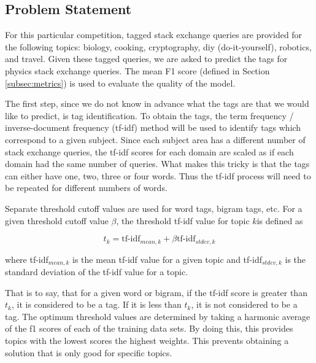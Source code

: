 \documentclass{article}
\def\eqstart{\begin{equation}}
\def\eqend{\end{equation}}
\begin{document}
\subsection{Problem Statement}



For this particular competition, tagged stack exchange queries are provided
for the following topics: biology, cooking, cryptography, diy
(do-it-yourself), robotics, and travel. Given these tagged queries, we are
asked to predict the tags for physics stack exchange queries. The mean F1
score (defined in Section \ref{subsec:metrics}) is used to evaluate the quality of the
model. 

The first step, since we do not know in advance what the tags are that we
would like to predict, is tag identification. To obtain the tags, the term
frequency / inverse-document frequency (tf-idf) method will be used to
identify tags which correspond to a given subject. Since each subject area has
a different number of stack exchange queries, the tf-idf scores for each
domain are scaled as if each domain had the same number of queries. What makes
this tricky is that the tags can either have one, two, three or four
words. Thus the tf-idf process will need to be repeated for different numbers
of words.

Separate threshold cutoff values are used for word tags, bigram tags,
etc. For a given threshold cutoff value \(\beta\), the threshold tf-idf value
for topic \(k\)is defined as

\eqstart
t_k = \textrm{tf-idf}_{mean,k} + \beta \textrm{tf-idf}_{stdev,k}
\eqend

where tf-idf\(_{mean,k}\) is the mean tf-idf value for a given topic and
tf-idf\(_{stdev,k}\) is the standard deviation of the tf-idf value for a topic.

That is to say, that for a given word or bigram, if the tf-idf score is
greater than \(t_k\), it is considered to be a tag. If it is less than
\(t_k\), it is not considered to be a tag. The optimum threshold
values are determined by taking a harmonic average of the f1 scores of each of
the training data sets. By doing this, this provides topics with the lowest
scores the highest weights. This prevents obtaining a solution that is only
good for specific topics.
\end{document}
